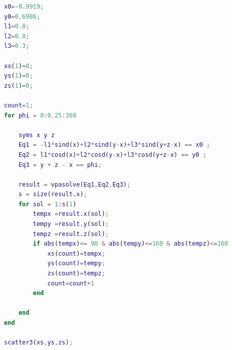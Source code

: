 \documentclass[twoside,twocolumn]{article}
\begin{document}
\begin{lstlisting}[language=matlab]
x0=-0.9919;
y0=0.6986;
l1=0.8;
l2=0.8;
l3=0.3;

xs(1)=0;
ys(1)=0;
zs(1)=0;

count=1;
for phi = 0:0.25:360

    syms x y z
    Eq1 = -l1*sind(x)+l2*sind(y-x)+l3*sind(y+z-x) == x0 ;
    Eq2 = l1*cosd(x)+l2*cosd(y-x)+l3*cosd(y+z-x) == y0 ;
    Eq3 = y + z - x == phi;

    result = vpasolve(Eq1,Eq2,Eq3);
    s = size(result.x);
    for sol = 1:s(1)
        tempx =result.x(sol);
        tempy =result.y(sol);
        tempz =result.z(sol);
        if abs(tempx)<= 90 & abs(tempy)<=160 & abs(tempz)<=160
            xs(count)=tempx;
            ys(count)=tempy;
            zs(count)=tempz;
            count=count+1
        end
        
    end  
end

scatter3(xs,ys,zs);
\end{lstlisting}
\end{document}
